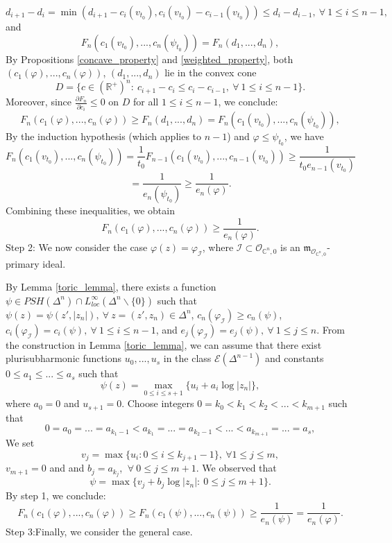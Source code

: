 \documentclass[a4paper,oneside,reqno,11pt]{article}
\begin{document}
$$d_{ i + 1 } - d_{ i } =\min ( d_{ i + 1 } - c_i ( v_{ t_0 } ), c_i ( v_{ t_0 } ) - c_{ i - 1 } ( v_{ t_0 } ) ) \leq d_{ i  } - d_{ i - 1 },\ \forall\ 1\leq i\leq n-1,$$
and
$$F_n ( c_1 ( v_{ t_0 } ), ... , c_{ n } ( \psi_{ t_0 } ) ) = F_n ( d_1, ..., d_n ),$$
By Propositions \ref{concave_property} and \ref{weighted_property}, both $( c_1 ( \varphi ), ... , c_{ n } ( \varphi  ) )$, $( d_1 , ... , d_n )$ lie in the convex cone
$$D = \{ c\in ( \mathbb R^{ + } )^n:\ c_{ i + 1 } - c_{ i } \leq c_{ i } - c_{ i - 1 },\ \forall\ 1\leq i\leq n-1 \}.$$
Moreover, since $\frac { \partial F_n } { \partial c_i }\leq 0$ on $D$ for all $1\leq i\leq n - 1$, we conclude: 
$$F_n ( c_1 ( \varphi ), ... , c_{ n } ( \varphi  ) ) \geq F_n ( d_1, ..., d_n ) = F_n ( c_1 ( v_{ t_0 } ), ... , c_{ n } ( \psi_{ t_0 } ) ),$$
By the induction hypothesis (which applies to $n-1$) and $\varphi\leq\psi_{ t_0 }$, we have
$$F_n ( c_1 ( v_{ t_0 } ), ... , c_{ n } ( \psi_{ t_0 } ) ) = \frac { 1 } { t_0 } F_{ n - 1 } ( c_1 ( v_{ t_0 } ), ... , c_{ n - 1 } ( v_{ t_0 } ) ) \geq \frac { 1 } { t_0 e_{ n - 1 } ( v_{ t_0 } ) }$$
$$= \frac { 1 } {  e_{ n } ( \psi_{ t_0 }) } \geq \frac { 1 } { e_n (\varphi ) }.$$
Combining these inequalities, we obtain
$$F_n ( c_1 ( \varphi ), ... , c_{ n } ( \varphi  ) ) \geq \frac { 1 } { e_n (\varphi ) }.$$
Step 2: We now consider the case $\varphi ( z ) = \varphi_{ \mathcal I }$, where $\mathcal I\subset\mathcal O_{ \mathbb C^n, 0 }$ is an $\mathfrak{m}_{ \mathcal O_{ \mathbb C^n, 0} }$-primary ideal.

By Lemma \ref{toric_lemma}, there exists a function $\psi\in PSH ( \Delta^n )\cap L_{ loc }^{ \infty } ( \Delta^n\backslash \{ 0 \} )$ such that $\psi ( z ) = \psi ( z' , | z_n | ),\ \forall\ z = ( z', z_n )\in \Delta^n$, $c_n ( \varphi_{\mathcal I } ) \geq c_n ( \psi )$, $c_i ( \varphi_{\mathcal I } ) = c_i ( \psi ),\ \forall\ 1\leq i\leq n-1$, and $e_j ( \varphi_{\mathcal I } ) = e_j ( \psi ),\ \forall\ 1\leq j\leq n$.
From the construction in Lemma \ref{toric_lemma}, we can assume that there exist plurisubharmonic functions $u_0, ... , u_s$ in the class $\mathcal E(\Delta^{n-1})$ and constants $0\leq a_1 \leq ... \leq a_s$ such that
$$\psi ( z ) = \max\limits_{ 0\leq i \leq s + 1 }  \{ u_i + a_i \log | z_n |  \},$$
where $a_0 = 0$ and $u_{ s + 1 } = 0$. Choose integers $0 = k_0 < k_1 < k_2 < ... < k_{ m + 1 }$ such that
$$0 = a_0 = ... = a_{ k_1 - 1 } < a_{ k_1 } = ... =a_{ k_2 - 1 } < ...< a_{ k_{ m + 1 } } = ... = a_{ s },$$
We set
$$v_j = \max \{ u_i : 0\leq i\leq k_{ j + 1 } - 1 \},\ \forall 1\leq j\leq m,$$
$v_{m+1}=0$ and and $b_j = a_{ k_j }$, $\ \forall\ 0\leq j\leq m + 1$. We observed that
$$\psi = \max \{ v_j + b_j \log| z_n | : \ 0\leq j\leq m + 1 \}.$$
By step 1, we conclude:
$$F_n ( c_1 ( \varphi ), ... , c_{ n } ( \varphi  ) )  \geq F_n ( c_1 ( \psi ), ... , c_{ n } ( \psi  ) ) \geq \frac { 1 } { e_n ( \psi ) } = \frac { 1 } { e_n (\varphi ) }.$$
Step 3:Finally, we consider the general case.
\end{document}
